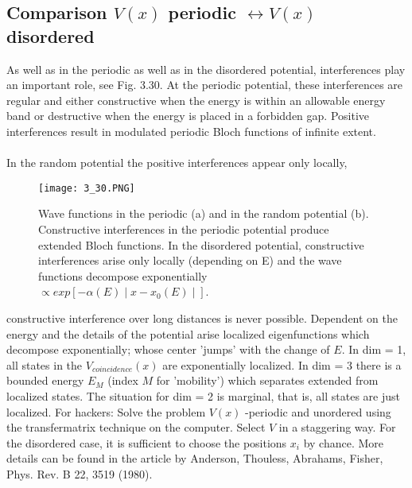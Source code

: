 \subsection{Comparison $V (x)$ periodic $\leftrightarrow V (x)$ disordered}
As well as in the periodic as well as in the disordered potential, interferences play an important role, see Fig. 3.30. At the periodic potential, these interferences are regular and either constructive when the energy is within an allowable energy band or destructive when the energy is placed in a forbidden gap. Positive interferences result in modulated periodic Bloch functions of infinite extent. \\\\
In the random potential the positive interferences appear only locally,
\begin{figure}[ht]
        \centering
        \texttt{[image: 3\_30.PNG]}
        \caption{Wave functions in the periodic (a) and in the random potential (b). Constructive interferences in the periodic potential produce extended Bloch functions. In the disordered potential, constructive interferences arise only locally (depending on E) and the wave functions decompose exponentially $\propto exp[-\alpha(E)\mid x-x_0(E)\mid]$.}
\end{figure}
constructive interference over long distances is never possible. Dependent on the energy and the details of the potential arise localized eigenfunctions which decompose exponentially; whose center 'jumps' with the change of $E$.
In dim = 1, all states in the $V_{coincidence}(x)$ are exponentially localized. In dim = 3 there is a bounded energy $E_M$ (index $M$ for 'mobility') which separates extended from localized states. The situation for dim = 2 is marginal, that is, all states are just localized.
For hackers: Solve the problem $V (x)$ -periodic and unordered using the transfermatrix technique on the computer. Select $V$ in a staggering way. For the disordered case, it is sufficient to choose the positions $x_i$ by chance. More details can be found in the article by Anderson, Thouless, Abrahams, Fisher, Phys. Rev. B 22, 3519 (1980).
